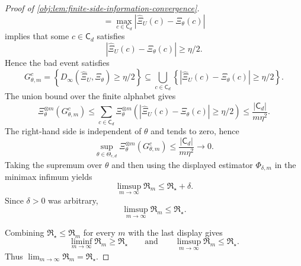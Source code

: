 \begin{proof}[Proof of \cref{obj:lem:finite-side-information-convergence}]
\[=
\max_{c\in\mathsf C_d}
\left|\widehat\Xi_U(c)-\Xi_\theta(c)\right|
\]
implies that some \(c\in\mathsf C_d\) satisfies
\[
\left|\widehat\Xi_U(c)-\Xi_\theta(c)\right|
\ge \eta/2 .
\]
Hence the bad event satisfies
\[
G_{\theta,m}^c
=
\left\{D_\infty(\widehat\Xi_U,\Xi_\theta)\ge\eta/2\right\}
\subseteq
\bigcup_{c\in\mathsf C_d}
\left\{
\left|\widehat\Xi_U(c)-\Xi_\theta(c)\right|
\ge \eta/2
\right\}.
\]
The union bound over the finite alphabet gives
\[
\Xi_\theta^{\otimes m}(G_{\theta,m}^{c})
\le
\sum_{c\in\mathsf C_d}
\Xi_\theta^{\otimes m}\left(
\left|\widehat\Xi_U(c)-\Xi_\theta(c)\right|
\ge \eta/2
\right)
\le
\frac{|\mathsf C_d|}{m\eta^2} .
\]
The right-hand side is independent of \(\theta\) and tends to zero, hence
\[
\sup_{\theta\in\Theta_{\epsilon,d}}
\Xi_\theta^{\otimes m}(G_{\theta,m}^{c})
\le
\frac{|\mathsf C_d|}{m\eta^2}
\longrightarrow0 .
\]
Taking the supremum over \(\theta\) and then using the displayed estimator
\(\Phi_{\delta,m}\) in the minimax infimum yields
\[
\limsup_{m\to\infty}\mathfrak R_m\le \mathfrak R_\star+\delta .
\]
Since \(\delta>0\) was arbitrary,
\[
\limsup_{m\to\infty}\mathfrak R_m\le \mathfrak R_\star .
\]

Combining \(\mathfrak R_\star\le\mathfrak R_m\) for every \(m\) with the last display gives
\[
\liminf_{m\to\infty}\mathfrak R_m\ge\mathfrak R_\star
\qquad\text{and}\qquad
\limsup_{m\to\infty}\mathfrak R_m\le\mathfrak R_\star .
\]
Thus \(\lim_{m\to\infty}\mathfrak R_m=\mathfrak R_\star\). %
\end{proof}

